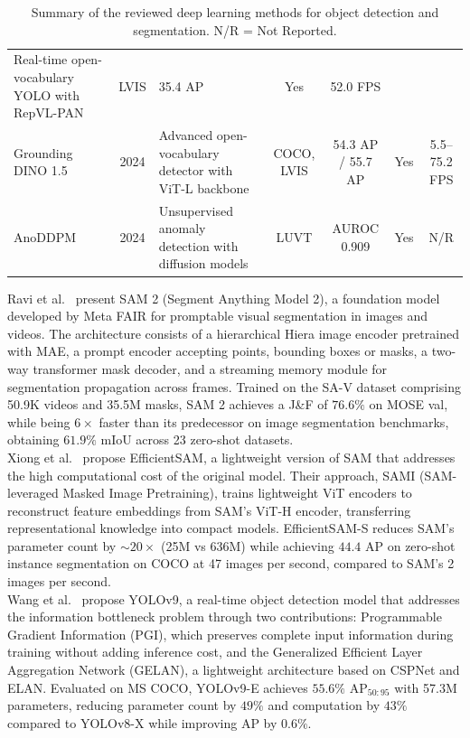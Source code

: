 \documentclass[11pt]{article}
\begin{document}
\begin{table}[phtb!]
\begin{center}
{\begin{tabular}{l c p{4.5cm} c c c c}
    Real-time open-vocabulary YOLO with RepVL-PAN &
    LVIS & 35.4 AP & Yes & 52.0 FPS \\
Grounding DINO 1.5~\cite{RenGroundingDINO15} & 2024 &
    Advanced open-vocabulary detector with ViT-L backbone &
    COCO, LVIS & 54.3 AP / 55.7 AP & Yes & 5.5--75.2 FPS \\
AnoDDPM~\cite{WyattAnoDDPM2022} & 2024 &
    Unsupervised anomaly detection with diffusion models &
    LUVT & AUROC 0.909 & Yes & N/R \\
\hline
\end{tabular}
}
\caption{\label{tab1:literatureReview}Summary of the reviewed deep learning
methods for object detection and segmentation. N/R = Not Reported.}
\end{center}
\end{table}



Ravi et al.~\cite{Ravi2024SAM2} present SAM 2 (Segment Anything Model 2), a
foundation model developed by Meta FAIR for promptable visual segmentation in
images and videos. The architecture consists of a hierarchical Hiera image
encoder pretrained with MAE, a prompt encoder accepting points, bounding boxes
or masks, a two-way transformer mask decoder, and a streaming memory module for
segmentation propagation across frames. Trained on the SA-V dataset comprising
50.9K videos and 35.5M masks, SAM 2 achieves a J\&F of $76.6\%$ on MOSE val,
while being $6\times$ faster than its predecessor on image segmentation
benchmarks, obtaining $61.9\%$ mIoU across 23 zero-shot datasets.\\

Xiong et al.~\cite{Xiong2023EfficientSAM} propose EfficientSAM, a lightweight
version of SAM that addresses the high computational cost of the original model.
Their approach, SAMI (SAM-leveraged Masked Image Pretraining), trains lightweight
ViT encoders to reconstruct feature embeddings from SAM's ViT-H encoder,
transferring representational knowledge into compact models. EfficientSAM-S
reduces SAM's parameter count by $\sim20\times$ (25M vs 636M) while achieving
$44.4$ AP on zero-shot instance segmentation on COCO at 47 images per second,
compared to SAM's 2 images per second.\\

Wang et al.~\cite{Wang2024YOLOv9} propose YOLOv9, a real-time object detection
model that addresses the information bottleneck problem through two contributions:
Programmable Gradient Information (PGI), which preserves complete input
information during training without adding inference cost, and the Generalized
Efficient Layer Aggregation Network (GELAN), a lightweight architecture based on
CSPNet and ELAN. Evaluated on MS COCO, YOLOv9-E achieves $55.6\%$ AP$_{50:95}$
with 57.3M parameters, reducing parameter count by $49\%$ and computation by
$43\%$ compared to YOLOv8-X while improving AP by $0.6\%$.\\
\end{document}
